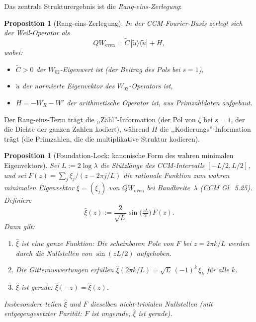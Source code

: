 \documentclass[12pt,a4paper]{article}
\newtheorem{proposition}[theorem]{Proposition}
\theoremstyle{definition}
\theoremstyle{remark}
\newcommand{\utilde}{\tilde{u}}
\newcommand{\Ctilde}{\tilde{C}}
\begin{document}
Das zentrale Strukturergebnis ist die \emph{Rang-eins-Zerlegung}:

\begin{proposition}[Rang-eins-Zerlegung]
\label{prop:rank1}
In der CCM-Fourier-Basis zerlegt sich der Weil-Operator als
\begin{equation}
\label{eq:rank1}
QW_{\mathrm{even}} = \Ctilde \, |\utilde\rangle\langle\utilde| + H,
\end{equation}
wobei:
\begin{itemize}
\item $\Ctilde > 0$ der $W_{02}$-Eigenwert ist (der Beitrag des
  Pols bei $s = 1$),
\item $\utilde$ der normierte Eigenvektor des $W_{02}$-Operators ist,
\item $H = -W_R - W'$ der arithmetische Operator ist, aus Primzahldaten aufgebaut.
\end{itemize}
\end{proposition}

Der Rang-eins-Term trägt die ,,Zähl''-Information (der Pol von $\zeta$ bei
$s = 1$, der die Dichte der ganzen Zahlen kodiert), während $H$ die
,,Kodierungs''-Information trägt (die Primzahlen, die die multiplikative
Struktur kodieren).

\begin{proposition}[Foundation-Lock: kanonische Form des wahren minimalen Eigenvektors]
\label{prop:foundation-lock}
Sei $L := 2\log\lambda$ die Stützlänge des CCM-Intervalls $[-L/2, L/2]$,
und sei $F(z) = \sum_{j} \xi_j / (z - 2\pi j / L)$ die rationale Funktion
zum wahren minimalen Eigenvektor $\xi = (\xi_j)$ von
$QW_{\mathrm{even}}$ bei Bandbreite~$\lambda$ (CCM Gl.~5.25). Definiere
\begin{equation}
\label{eq:xihat-def}
  \hat{\xi}(z) := \frac{2}{\sqrt{L}} \sin\!\bigl(\tfrac{zL}{2}\bigr)\, F(z).
\end{equation}
Dann gilt:
\begin{enumerate}[label=(\alph*)]
  \item $\hat{\xi}$ ist eine \emph{ganze} Funktion: Die scheinbaren Pole
    von $F$ bei $z = 2\pi k/L$ werden durch die Nullstellen von $\sin(zL/2)$
    aufgehoben.
  \item Die Gitterauswertungen erfüllen
    $\hat{\xi}(2\pi k/L) = \sqrt{L}\,(-1)^k\,\xi_k$ für alle $k$.
  \item $\hat{\xi}$ ist gerade: $\hat{\xi}(-z) = \hat{\xi}(z)$.
\end{enumerate}
Insbesondere teilen $\hat{\xi}$ und $F$ dieselben nicht-trivialen Nullstellen
(mit entgegengesetzter Parität: $F$ ist ungerade, $\hat{\xi}$ ist gerade).
\end{proposition}
\end{document}
